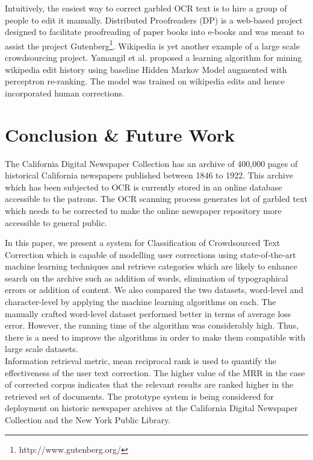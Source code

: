 \documentclass{sig-alternate}
\begin{document}
Intuitively, the easiest way to correct garbled OCR text is to hire a group of people to edit it manually. Distributed Proofreaders (DP) \cite{DP} is a web-based project designed to facilitate proofreading of paper books into e-books and was meant to assist the project Gutenberg\footnote{http://www.gutenberg.org/}. Wikipedia is yet another example of a large scale crowdsourcing project. Yamangil et al. \cite{wikiedits} proposed a learning algorithm for mining wikipedia edit history using baseline Hidden Markov Model augmented with perceptron re-ranking. The model was trained on wikipedia edits and hence incorporated human corrections. 



\section{Conclusion \& Future Work}
\label{sec:conc}
The California Digital Newspaper Collection has an archive of 400,000 pages of historical California newspapers published between 1846 to 1922. This archive which has been subjected to OCR is currently stored in an online database accessible to the patrons. The OCR scanning process generates lot of garbled text which needs to be corrected to make the online newspaper repository more accessible to general public. 

In this paper, we present a system for Classification of Crowdsourced Text Correction which is capable of modelling user corrections using state-of-the-art machine learning techniques and retrieve categories which are likely to enhance search on the archive such as addition of words, elimination of typographical errors or addition of content. We also compared the two datasets, word-level and character-level by applying the machine learning algorithms on each. The manually crafted word-level dataset performed better in terms of average loss error. However, the running time of the algorithm was considerably high. Thus, there is a need to improve the algorithms in order to make them compatible with large scale datasets.\\
Information retrieval metric, mean reciprocal rank is used to quantify the effectiveness of the user text correction. The higher value of the MRR in the case of corrected corpus indicates that the relevant results are ranked higher in the retrieved set of documents. The prototype system is being considered for deployment on historic newspaper archives at the California Digital Newspaper Collection and the New York Public Library.
\end{document}
